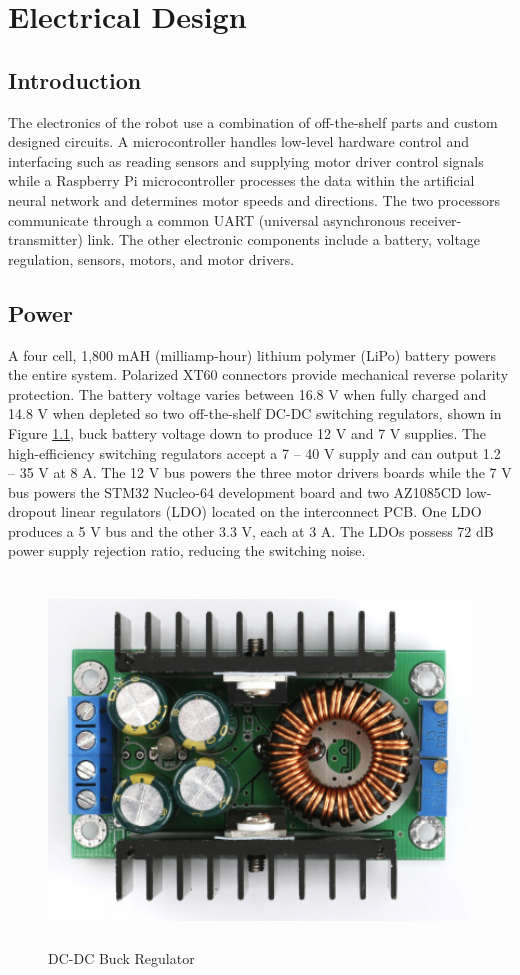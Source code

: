 \chapter{Electrical Design}
\section{Introduction}
The electronics of the robot use a combination of off-the-shelf parts and custom designed circuits. A microcontroller handles low-level hardware control and interfacing such as reading sensors and supplying motor driver control signals while a Raspberry Pi microcontroller processes the data within the artificial neural network and determines motor speeds and directions. The two processors communicate through a common UART (universal asynchronous receiver-transmitter) link. The other electronic components include a battery, voltage regulation, sensors, motors, and motor drivers.

\section{Power}
A four cell, 1,800 mAH (milliamp-hour) lithium polymer (LiPo) battery powers the entire system. Polarized XT60 connectors provide mechanical reverse polarity protection. The battery voltage varies between 16.8 V when fully charged and 14.8 V when depleted so two off-the-shelf DC-DC switching regulators, shown in Figure \ref{fig:smps}, buck battery voltage down to produce 12 V and 7 V supplies. The high-efficiency switching regulators accept a 7 -- 40 V supply and can output 1.2 -- 35 V at 8 A. The 12 V bus powers the three motor drivers boards while the 7 V bus powers the STM32 Nucleo-64 development board and two AZ1085CD low-dropout linear regulators (LDO) located on the interconnect PCB. One LDO produces a 5 V bus and the other 3.3 V, each at 3 A. The LDOs possess 72 dB power supply rejection ratio, reducing the switching noise. 

\begin{figure}[H]   %
	\centering \includegraphics[width=6in, height=3.85in, keepaspectratio]{figures/smps.png}
	\caption{DC-DC Buck Regulator \cite{smps}}\label{fig:smps}
\end{figure}


